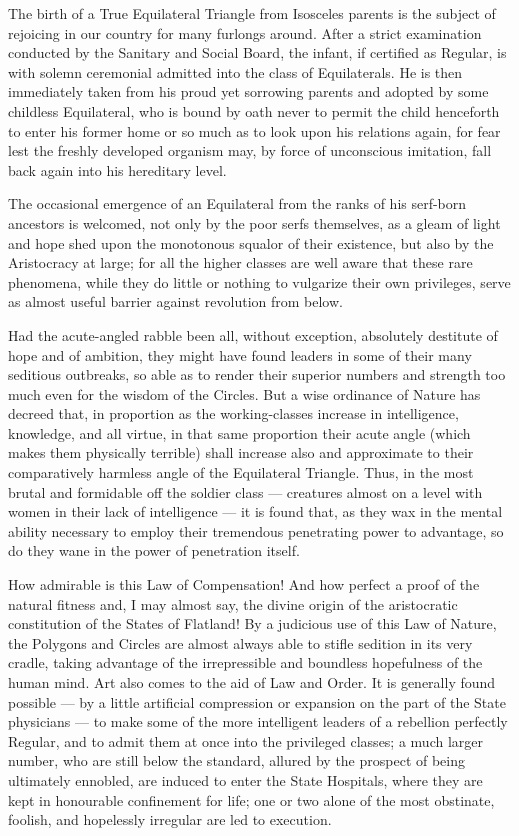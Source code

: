 \documentclass[12pt, a4paper, oneside]{memoir}
\begin{document}
The birth of a True Equilateral Triangle from Isosceles parents is the subject
of rejoicing in our country for many furlongs around. After a strict
examination conducted by the Sanitary and Social Board, the infant, if
certified as Regular, is with solemn ceremonial admitted into the class of
Equilaterals. He is then immediately taken from his proud yet sorrowing
parents and adopted by some childless Equilateral, who is bound by oath never
to permit the child henceforth to enter his former home or so much as to look
upon his relations again, for fear lest the freshly developed organism may, by
force of unconscious imitation, fall back again into his hereditary level.

The occasional emergence of an Equilateral from the ranks of his serf-born
ancestors is welcomed, not only by the poor serfs themselves, as a gleam of
light and hope shed upon the monotonous squalor of their existence, but also
by the Aristocracy at large; for all the higher classes are well aware that
these rare phenomena, while they do little or nothing to vulgarize their own
privileges, serve as almost useful barrier against revolution from below.

Had the acute-angled rabble been all, without exception, absolutely destitute
of hope and of ambition, they might have found leaders in some of their many
seditious outbreaks, so able as to render their superior numbers and strength
too much even for the wisdom of the Circles. But a wise ordinance of Nature
has decreed that, in proportion as the working-classes increase in
intelligence, knowledge, and all virtue, in that same proportion their acute
angle (which makes them physically terrible) shall increase also and
approximate to their comparatively harmless angle of the Equilateral Triangle.
Thus, in the most brutal and formidable off the soldier class --- creatures
almost on a level with women in their lack of intelligence --- it is found that,
as they wax in the mental ability necessary to employ their tremendous
penetrating power to advantage, so do they wane in the power of penetration
itself.

How admirable is this Law of Compensation! And how perfect a proof of the
natural fitness and, I may almost say, the divine origin of the aristocratic
constitution of the States of Flatland! By a judicious use of this Law of
Nature, the Polygons and Circles are almost always able to stifle sedition in
its very cradle, taking advantage of the irrepressible and boundless
hopefulness of the human mind. Art also comes to the aid of Law and Order. It
is generally found possible --- by a little artificial compression or expansion
on the part of the State physicians --- to make some of the more intelligent
leaders of a rebellion perfectly Regular, and to admit them at once into the
privileged classes; a much larger number, who are still below the standard,
allured by the prospect of being ultimately ennobled, are induced to enter the
State Hospitals, where they are kept in honourable confinement for life; one
or two alone of the most obstinate, foolish, and hopelessly irregular are led
to execution.
\end{document}
